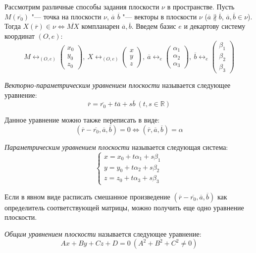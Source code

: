 Рассмотрим различные способы задания плоскости $\nu$ в пространстве. Пусть $M (\overline{r_0})$ "--- точка на плоскости $\nu$, $\overline{a}$ $\overline{b}$ "--- векторы в плоскости $\nu$ ($\overline{a} \nparallel \overline{b}$, $\overline{a}, \overline{b} \in \nu$). Тогда $X (\overline{r}) \in \nu \Leftrightarrow \overline{MX} \text{ компланарен } \overline{a}, \overline{b}$. Введем базис $e$ и декартову систему координат $(O, e)$:
\[M \leftrightarrow_{(O, e)}
\begin{pmatrix}
x_0\\y_0\\z_0
\end{pmatrix},~
X \leftrightarrow_{(O, e)}
\begin{pmatrix}
x\\y\\z
\end{pmatrix},~
\overline{a} \leftrightarrow_{e}
\begin{pmatrix}
\alpha_1\\\alpha_2\\\alpha_3
\end{pmatrix},~
\overline{b} \leftrightarrow_{e}
\begin{pmatrix}
\beta_1\\\beta_2\\\beta_3
\end{pmatrix}\]

\begin{definition} \textit{Векторно-параметрическим уравнением плоскости} называется следующее уравнение:
	\[\overline{r} = \overline{r_0} + t\overline{a} + s\overline{b}~(t,s \in \mathbb{R})\]
	
	Данное уравнение можно также переписать в виде:
	\[(\overline{r} - \overline{r_0}, \overline{a}, \overline{b}) = 0 \Leftrightarrow (\overline{r}, \overline{a}, \overline{b}) = \alpha\]
\end{definition}

\begin{definition} \textit{Параметрическим уравнением плоскости} называется следующая система:
	\[\left\{
	\begin{aligned}
	x = x_0 + t\alpha_1 + s\beta_1\\
	y = y_0 + t\alpha_2 + s\beta_2\\
	z = z_0 + t\alpha_3 + s\beta_3
	\end{aligned}
	\right.
	\]
\end{definition}

Если в явном виде расписать смешанное произведение $(\overline{r} - \overline{r_0}, \overline{a}, \overline{b})$ как определитель соответствующей матрицы, можно получить еще одно уравнение плоскости.
\begin{definition}
	\textit{Общим уравнением плоскости} называется следующее уравнение:
	\[Ax + By + Cz + D = 0~(A^2+B^2+C^2 \ne 0)\]
\end{definition}

